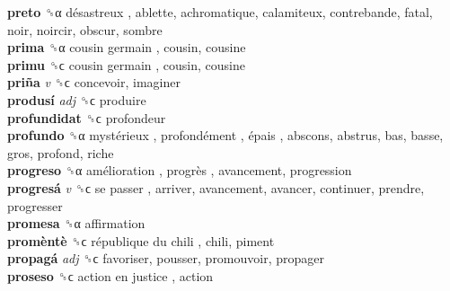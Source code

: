 \textbf{preto} ␝α   désastreux , ablette, achromatique, calamiteux, contrebande, fatal, noir, noircir, obscur, sombre  \\
\textbf{prima} ␝α   cousin germain , cousin, cousine  \\
\textbf{primu} ␝ϲ   cousin germain , cousin, cousine  \\
\textbf{priña} \emph{v}  ␝ϲ  concevoir, imaginer  \\
\textbf{produsí} \emph{adj}  ␝ϲ  produire  \\
\textbf{profundidat} ␝ϲ  profondeur  \\
\textbf{profundo} ␝α   mystérieux ,  profondément ,  épais , abscons, abstrus, bas, basse, gros, profond, riche  \\
\textbf{progreso} ␝α   amélioration ,  progrès , avancement, progression  \\
\textbf{progresá} \emph{v}  ␝ϲ   se passer , arriver, avancement, avancer, continuer, prendre, progresser  \\
\textbf{promesa} ␝α  affirmation  \\
\textbf{promèntè} ␝ϲ   république du chili , chili, piment  \\
\textbf{propagá} \emph{adj}  ␝ϲ  favoriser, pousser, promouvoir, propager  \\
\textbf{proseso} ␝ϲ   action en justice , action  \\
